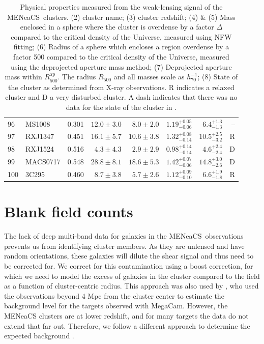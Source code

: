 \documentclass[useAMS,usenatbib]{mnras}
\newcommand{\mn}{MENeaCS}
\begin{document}
\begin{table}
\begin{tabularx}{1.0\textwidth}{ l l r r r r r r}
96 & MS1008 & 0.301 & $12.0 \pm 3.0$ & $8.0 \pm 2.0$ & $1.19_{-0.06}^{+0.05}$ & $6.4_{-1.3}^{+1.3}$ & -- \\
97 & RXJ1347 & 0.451 & $16.1 \pm 5.7$ & $10.6 \pm 3.8$ & $1.32_{-0.14}^{+0.08}$ & $10.5_{-3.2}^{+2.5}$ & R \\
98 & RXJ1524 & 0.516 & $4.3 \pm 4.3$ & $2.9 \pm 2.9$ & $0.98_{-0.14}^{+0.14}$ & $4.6_{-2.4}^{+2.4}$ & D \\
99 & MACS0717 & 0.548 & $28.8 \pm 8.1$ & $18.6 \pm 5.3$ & $1.42_{-0.06}^{+0.07}$ & $14.8_{-2.6}^{+3.0}$ & D \\
100 & 3C295 & 0.460 & $8.7 \pm 3.8$ & $5.7 \pm 2.6$ & $1.12_{-0.10}^{+0.09}$ & $6.6_{-1.8}^{+1.9}$ & R \\

\hline 
 \end{tabularx}
\caption{Physical properties measured from the weak-lensing signal of the \mn \ clusters. (2) cluster name; (3) cluster redshift; (4) \& (5) Mass enclosed in a sphere where the cluster is overdense by a factor $\Delta$ compared to the critical density of the Universe, measured using NFW fitting; (6) Radius of a sphere which encloses a region overdense by a factor 500 compared to the critical density of the Universe, measured using the deprojected aperture mass method; (7) Deprojected aperture mass within $R_{500}^\mathrm{ap}$. The radius $R_{500}$ and all masses scale as $h_{70}^{-1}$; (8) State of the cluster as determined from X-ray observations. R indicates a relaxed cluster and D a very disturbed cluster. A dash indicates that there was no data for the state of the cluster in \citet{mantz15b}.} \label{tbl:masses}
\end{table}
















\section{Blank field counts}
\label{app:blanks}

The lack of deep multi-band data for galaxies in the \mn \ observations prevents us from identifying cluster members. As they are unlensed and have random orientations, these galaxies will dilute the shear signal and thus need to be corrected for. We correct for this contamination using a boost correction, for which we need to model the excess of galaxies in the cluster compared to the field as a function of cluster-centric radius. 
This approach was also used by , who used the observations beyond 4 Mpc from the cluster center to estimate the background level for the targets observed with MegaCam. However, the MENeaCS clusters are at lower redshift, and for many targets the data do not extend that far out. Therefore, we follow a different approach to determine the expected background . 
\end{document}
